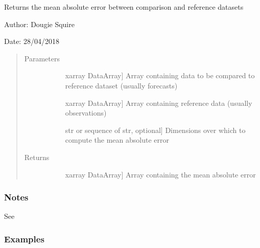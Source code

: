 \documentclass[letterpaper,10pt,english]{sphinxmanual}
\begin{document}
\begin{fulllineitems}
\label{\detokenize{skill_doc:skill.mean_absolute_error}}
Returns the mean absolute error between comparison and reference datasets

\begin{DUlineblock}{0em}
\item[] Author: Dougie Squire
\item[] Date: 28/04/2018
\end{DUlineblock}
\begin{quote}\begin{description}
\item[{Parameters}] \leavevmode\begin{description}
\item[{}] \leavevmode{[}xarray DataArray{]}
Array containing data to be compared to reference dataset (usually forecasts)

\item[{}] \leavevmode{[}xarray DataArray{]}
Array containing reference data (usually observations)

\item[{}] \leavevmode{[}str or sequence of str, optional{]}
Dimensions over which to compute the mean absolute error

\end{description}

\item[{Returns}] \leavevmode\begin{description}
\item[{}] \leavevmode{[}xarray DataArray{]}
Array containing the mean absolute error

\end{description}

\end{description}\end{quote}
\subsubsection*{Notes}

See 
\subsubsection*{Examples}


\end{fulllineitems}
\end{document}
